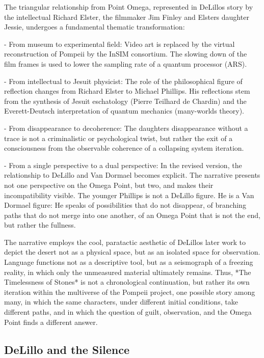 \documentclass[
  ngerman,
]{article}
\begin{document}
The triangular relationship from Point Omega, represented in
DeLillo\textquotesingle s story by the intellectual Richard Elster, the
filmmaker Jim Finley and Elster\textquotesingle s daughter Jessie,
undergoes a fundamental thematic transformation:

- From museum to experimental field: Video art is replaced by the
virtual reconstruction of Pompeii by the InSIM consortium. The slowing
down of the film frames is used to lower the sampling rate of a quantum
processor (ARS).

- From intellectual to Jesuit physicist: The role of the philosophical
figure of reflection changes from Richard Elster to Michael Phillips.
His reflections stem from the synthesis of Jesuit eschatology (Pierre
Teilhard de Chardin) and the Everett-Deutsch interpretation of quantum
mechanics (many-worlds theory).

- From disappearance to decoherence: The daughter\textquotesingle s
disappearance without a trace is not a criminalistic or psychological
twist, but rather the exit of a consciousness from the observable
coherence of a collapsing system iteration.

- From a single perspective to a dual perspective: In the revised
version, the relationship to DeLillo and Van Dormael becomes explicit.
The narrative presents not one perspective on the Omega Point, but two,
and makes their incompatibility visible. The younger Phillips is not a
DeLillo figure. He is a Van Dormael figure: He speaks of possibilities
that do not disappear, of branching paths that do not merge into one
another, of an Omega Point that is not the end, but rather the fullness.

The narrative employs the cool, paratactic aesthetic of
DeLillo\textquotesingle s later work to depict the desert not as a
physical space, but as an isolated space for observation. Language
functions not as a descriptive tool, but as a seismograph of a freezing
reality, in which only the unmeasured material ultimately remains. Thus,
*The Timelessness of Stones* is not a chronological continuation, but
rather its own iteration within the multiverse of the Pompeii project,
one possible story among many, in which the same characters, under
different initial conditions, take different paths, and in which the
question of guilt, observation, and the Omega Point finds a different
answer.

\subsection{DeLillo and the Silence}\label{delillo-and-the-silence}
\end{document}

